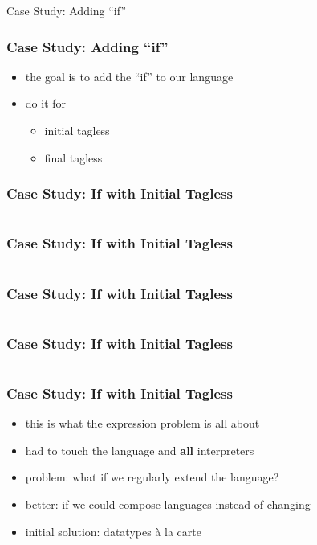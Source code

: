 \documentclass[aspectratio=169, hyperref={colorlinks, linkcolor=beamer@centricgreen}, urlcolor=links]{beamer}
\begin{document}
\begin{frame}
  \begin{center}
    \Huge
    Case Study: Adding ``if''
  \end{center}
\end{frame}

\begin{frame}
  \frametitle{Case Study: Adding ``if''}
  \begin{itemize}
  \item the goal is to add the ``if'' to our language
  \item do it for
    \begin{itemize}
    \item initial tagless
    \item final tagless
    \end{itemize}
  \end{itemize}
\end{frame}

\begin{frame}[fragile]
  \frametitle{Case Study: If with Initial Tagless}
  \inputminted[fontsize=\footnotesize]{scala}{snippets/initial-tagless-expr-if.scala}
\end{frame}

\begin{frame}[fragile]
  \frametitle{Case Study: If with Initial Tagless}
  \inputminted[fontsize=\footnotesize]{scala}{snippets/initial-tagless-sample-if.scala}
\end{frame}

\begin{frame}[fragile]
  \frametitle{Case Study: If with Initial Tagless}
  \inputminted[fontsize=\footnotesize]{scala}{snippets/initial-tagless-interp-if.scala}
\end{frame}

\begin{frame}[fragile]
  \frametitle{Case Study: If with Initial Tagless}
  \inputminted[fontsize=\footnotesize]{scala}{snippets/initial-tagless-handle-if.scala}
\end{frame}

\begin{frame}
  \frametitle{Case Study: If with Initial Tagless}
  \begin{itemize}
  \item this is what the expression problem is all about
  \item had to touch the language and \textbf{all} interpreters
  \item problem: what if we regularly extend the language?
  \item better: if we could compose languages instead of changing
  \item initial solution: datatypes \`{a} la carte
  \end{itemize}
\end{frame}
\end{document}

